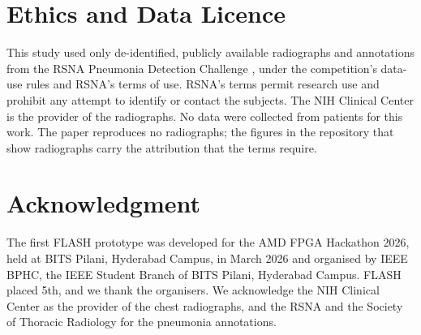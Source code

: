 \documentclass[conference]{IEEEtran}
\begin{document}
\section*{Ethics and Data Licence}

This study used only de-identified, publicly available radiographs and annotations from the RSNA
Pneumonia Detection Challenge \cite{rsnadata,shih2019rsna}, under the competition's data-use rules
and RSNA's terms of use. RSNA's terms permit research use and prohibit any attempt to identify or
contact the subjects. The NIH Clinical Center is the provider of the radiographs. No data were
collected from patients for this work. The paper reproduces no radiographs; the figures in the
repository that show radiographs carry the attribution that the terms require.

\section*{Acknowledgment}

The first FLASH prototype was developed for the AMD FPGA Hackathon 2026, held at BITS Pilani,
Hyderabad Campus, in March 2026 and organised by IEEE BPHC, the IEEE Student Branch of BITS
Pilani, Hyderabad Campus. FLASH placed 5th, and we thank the organisers. We acknowledge the NIH
Clinical Center as the provider of the chest radiographs, and the RSNA and the Society of
Thoracic Radiology for the pneumonia annotations.
\end{document}
